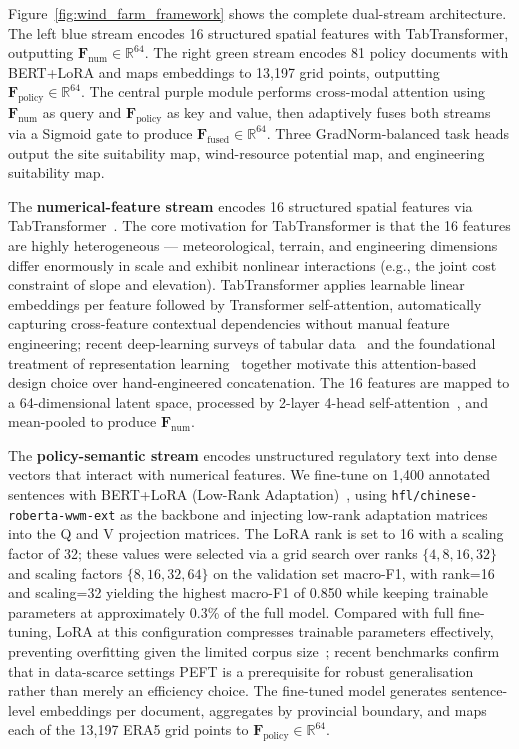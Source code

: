 \documentclass[12pt, a4paper]{article}
\begin{document}
Figure~\ref{fig:wind_farm_framework} shows the complete
dual-stream architecture. The left blue stream encodes 16
structured spatial features with TabTransformer, outputting
$\mathbf{F}_\text{num} \in \mathbb{R}^{64}$. The right green
stream encodes 81 policy documents with BERT+LoRA and maps
embeddings to 13,197 grid points, outputting
$\mathbf{F}_\text{policy} \in \mathbb{R}^{64}$. The central
purple module performs cross-modal attention using
$\mathbf{F}_\text{num}$ as query and
$\mathbf{F}_\text{policy}$ as key and value, then adaptively
fuses both streams via a Sigmoid gate to produce
$\mathbf{F}_\text{fused} \in \mathbb{R}^{64}$. Three
GradNorm-balanced task heads output the site suitability map,
wind-resource potential map, and engineering suitability map.

The \textbf{numerical-feature stream} encodes 16 structured
spatial features via TabTransformer~\cite{huang2020tabtransformer}.
The core motivation for TabTransformer is that the 16 features
are highly heterogeneous --- meteorological, terrain, and
engineering dimensions differ enormously in scale and exhibit
nonlinear interactions (e.g., the joint cost constraint of
slope and elevation). TabTransformer applies learnable linear
embeddings per feature followed by Transformer self-attention,
automatically capturing cross-feature contextual dependencies
without manual feature engineering; recent deep-learning
surveys of tabular data~\cite{borisov2022,shwartz2022} and the
foundational treatment of representation learning~\cite{lecun2015}
together motivate this attention-based design choice over
hand-engineered concatenation. The 16 features are mapped
to a 64-dimensional latent space, processed by 2-layer
4-head self-attention~\cite{vaswani2017}, and mean-pooled to produce
$\mathbf{F}_\text{num}$.

The \textbf{policy-semantic stream} encodes unstructured
regulatory text into dense vectors that interact with numerical
features. We fine-tune on 1,400 annotated sentences with
BERT+LoRA (Low-Rank Adaptation)~\cite{devlin2019,hu2022,liu2019roberta,cui2020chinesebert}, using
\texttt{hfl/chinese-roberta-wwm-ext} as the backbone and
injecting low-rank adaptation matrices into the Q and V
projection matrices. The LoRA rank is set to 16 with a scaling
factor of 32; these values were selected via a grid search
over ranks $\{4, 8, 16, 32\}$ and scaling factors
$\{8, 16, 32, 64\}$ on the validation set macro-F1, with
rank=16 and scaling=32 yielding the highest macro-F1 of 0.850
while keeping trainable parameters at approximately 0.3\% of
the full model. Compared with full fine-tuning, LoRA at this
configuration compresses trainable parameters effectively,
preventing overfitting given the limited corpus
size~\cite{peft2025lora}; recent benchmarks confirm that
in data-scarce settings PEFT is a prerequisite for robust
generalisation rather than merely an efficiency choice. The
fine-tuned model generates sentence-level embeddings per
document, aggregates by provincial boundary, and maps each
of the 13,197 ERA5 grid points to
$\mathbf{F}_\text{policy} \in \mathbb{R}^{64}$.
\end{document}
